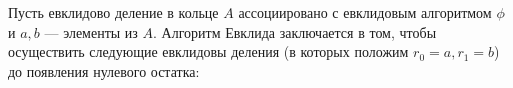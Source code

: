\documentclass{../../template/mai_book}
\begin{document}
\begin{algo}
Пусть евклидово деление в кольце $A$ ассоциировано с евклидовым алгоритмом $\phi$ и $a, b$ — элементы из $A$. Алгоритм Евклида заключается в том, чтобы осуществить следующие евклидовы деления (в которых положим $r_0 = a, r_1 = b$) до появления нулевого остатка:
\end{algo}
%
%
\end{document}
